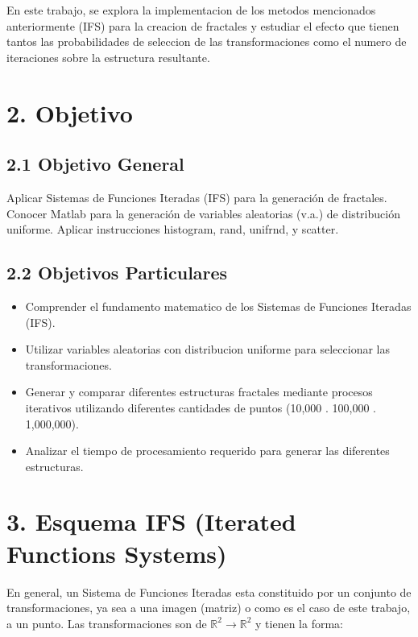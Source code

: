 \documentclass[12pt,a4paper]{article}
\begin{document}
En este trabajo, se explora la implementacion de los metodos mencionados anteriormente (IFS) para la creacion de fractales y estudiar el efecto que tienen tantos las probabilidades de seleccion de las transformaciones como el numero de iteraciones sobre la estructura resultante.

\section*{2. Objetivo}

\subsection*{2.1 Objetivo General}

Aplicar Sistemas de Funciones Iteradas (IFS) para la generación de fractales. Conocer Matlab para la
generación de variables aleatorias (v.a.) de distribución uniforme. Aplicar instrucciones histogram, rand,
unifrnd, y scatter.

\subsection*{2.2 Objetivos Particulares}

\begin{itemize}
    \item Comprender el fundamento matematico de los Sistemas de Funciones Iteradas (IFS).
    \item Utilizar variables aleatorias con distribucion uniforme para seleccionar las transformaciones.
    \item Generar y comparar diferentes estructuras fractales mediante procesos iterativos utilizando diferentes cantidades de puntos (10,000 . 100,000 . 1,000,000).
    \item Analizar el tiempo de procesamiento requerido para generar las diferentes estructuras.
\end{itemize}

\section*{3. Esquema IFS (Iterated Functions Systems)}

En general, un Sistema de Funciones Iteradas esta constituido por un conjunto de transformaciones, ya sea a una imagen (matriz) o como es el caso de este trabajo, a un punto. Las transformaciones son de $\mathbb{R}^2 \rightarrow \mathbb{R}^2$ y tienen la forma:
\end{document}
